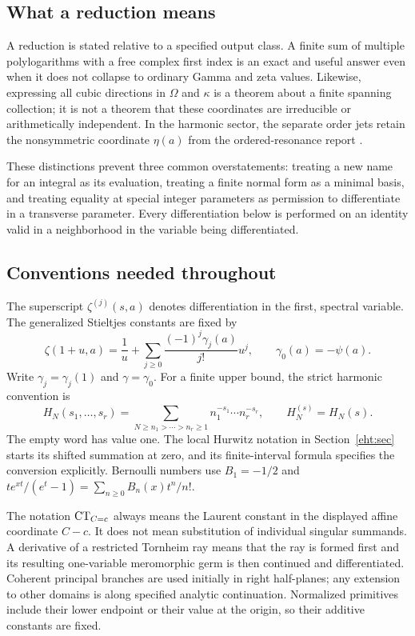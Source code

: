 \subsection{What a reduction means}

A reduction is stated relative to a specified output class. A finite
sum of multiple polylogarithms with a free complex first index is an
exact and useful answer even when it does not collapse to ordinary
Gamma and zeta values. Likewise, expressing all cubic directions in
$\Omega$ and $\kappa$ is a theorem about a finite spanning collection;
it is not a theorem that these coordinates are irreducible or
arithmetically independent. In the harmonic sector, the separate
order jets retain the nonsymmetric coordinate $\eta(a)$ from the
ordered-resonance report \cite{RepoOrdered}.

These distinctions prevent three common overstatements: treating a
new name for an integral as its evaluation, treating a finite
normal form as a minimal basis, and treating equality at special
integer parameters as permission to differentiate in a transverse
parameter. Every differentiation below is performed on an identity
valid in a neighborhood in the variable being differentiated.

\subsection{Conventions needed throughout}

The superscript $\zeta^{(j)}(s,a)$ denotes differentiation in the
first, spectral variable. The generalized Stieltjes constants are
fixed by
\begin{equation}\label{scope:Stieltjes}
 \zeta(1+u,a)=\frac1u+
       \sum_{j\ge0}\frac{(-1)^j\gamma_j(a)}{j!}u^j,
 \qquad \gamma_0(a)=-\psi(a).
\end{equation}
Write $\gamma_j=\gamma_j(1)$ and $\gamma=\gamma_0$.
For a finite upper bound, the strict harmonic convention is
\[
 H_N(s_1,\ldots,s_r)
   =\sum_{N\ge n_1>\cdots>n_r\ge1}
                          n_1^{-s_1}\cdots n_r^{-s_r},
 \qquad H_N^{(s)}=H_N(s).
\]
The empty word has value one. The local Hurwitz notation in
Section~\ref{eht:sec} starts its shifted summation at zero, and its
finite-interval formula specifies the conversion explicitly.
Bernoulli numbers use $B_1=-1/2$ and
$te^{xt}/(e^t-1)=\sum_{n\ge0}B_n(x)t^n/n!$.

The notation $\operatorname{CT}_{C=c}$ always means the Laurent constant in the
displayed affine coordinate $C-c$. It does not mean substitution of
individual singular summands. A derivative of a restricted Tornheim
ray means that the ray is formed first and its resulting one-variable
meromorphic germ is then continued and differentiated. Coherent
principal branches are used initially in right half-planes; any
extension to other domains is along specified analytic continuation.
Normalized primitives include their lower endpoint or their value at
the origin, so their additive constants are fixed.

